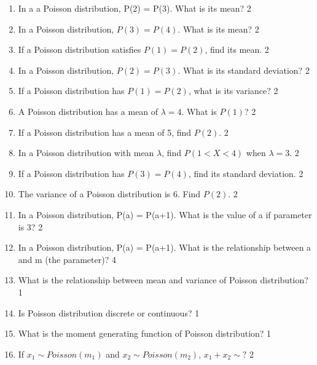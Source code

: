 \documentclass[a4paper,oneside, margin=1.4in]{book}
\begin{document}
\begin{enumerate}
\item In a a Poisson distribution, P(2) = P(3). What is its mean?  \hfill 2

\item In a Poisson distribution, \( P(3) = P(4) \). What is its mean? \hfill 2

\item If a Poisson distribution satisfies \( P(1) = P(2) \), find its mean. \hfill 2

\item In a Poisson distribution, \( P(2) = P(3) \). What is its standard deviation? \hfill 2

\item If a Poisson distribution has \( P(1) = P(2) \), what is its variance? \hfill 2

\item A Poisson distribution has a mean of \( \lambda = 4 \). What is \( P(1) \)? \hfill 2

\item If a Poisson distribution has a mean of 5, find \( P(2) \). \hfill 2

\item In a Poisson distribution with mean \( \lambda \), find \( P(1 < X < 4) \) when \( \lambda = 3 \). \hfill 2

\item If a Poisson distribution has \( P(3) = P(4) \), find its standard deviation. \hfill 2

\item The variance of a Poisson distribution is 6. Find \( P(2) \). \hfill 2

 \item In a Poisson distribution, P(a) = P(a+1). What is the value of a if parameter is 3? \hfill 2

\item In a Poisson distribution, P(a) = P(a+1). What is the relationship between a and m (the parameter)? \hfill 4

\item What is the relationship between mean and variance of Poisson distribution? \hfill 1

\item Is Poisson distribution discrete or continuous? \hfill 1

\item What is the moment generating function of Poisson distribution? \hfill 1

\item If $x_1 \sim Poisson (m_1)$ and  $x_2 \sim Poisson (m_2)$,  $x_1 + x_2 \sim ?$ \hfill 2


\end{enumerate}
\end{document}
